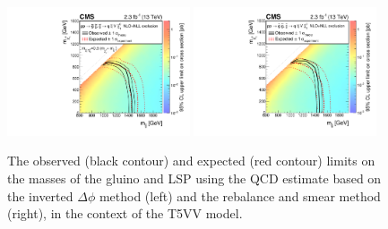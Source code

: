 \begin{figure}[tb!]
\centering
    \includegraphics[width=0.48\textwidth]{figures/SusySearches/Ra2b2015/SMSqqqqVVXSEC.pdf}
    \includegraphics[width=0.48\textwidth]{figures/SusySearches/Ra2b2015/SMSqqqqVVXSEC_rps.pdf}
    \caption{The observed (black contour) and expected (red contour) limits on the masses of the gluino and LSP using the QCD estimate based on the inverted $\Delta\phi$ method (left) and the rebalance and smear method (right), in the context of the T5VV model. }
    \label{fig:limitsT5vv}
\end{figure}

